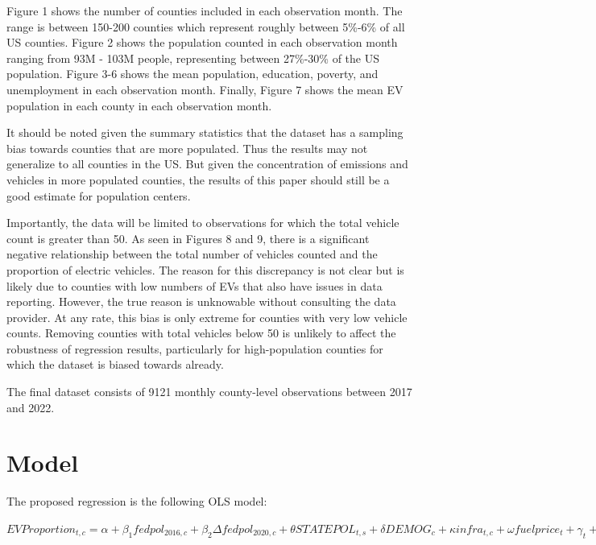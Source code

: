 \documentclass{article}
\begin{document}
Figure 1 shows the number of counties included in each observation month. The range is between 150-200 counties which represent roughly between 5\%-6\% of all US counties. Figure 2 shows the population counted in each observation month ranging from 93M - 103M people, representing between 27\%-30\% of the US population. Figure 3-6 shows the mean population, education, poverty, and unemployment in each observation month. Finally, Figure 7 shows the mean EV population in each county in each observation month.

It should be noted given the summary statistics that the dataset has a sampling bias towards counties that are more populated. Thus the results may not generalize to all counties in the US. But given the concentration of emissions and vehicles in more populated counties, the results of this paper should still be a good estimate for population centers.  

Importantly, the data will be limited to observations for which the total vehicle count is greater than 50. As seen in Figures 8 and 9, there is a significant negative relationship between the total number of vehicles counted and the proportion of electric vehicles. The reason for this discrepancy is not clear but is likely due to counties with low numbers of EVs that also have issues in data reporting. However, the true reason is unknowable without consulting the data provider. At any rate, this bias is only extreme for counties with very low vehicle counts. Removing counties with total vehicles below 50 is unlikely to affect the robustness of regression results, particularly for high-population counties for which the dataset is biased towards already. 

The final dataset consists of 9121 monthly county-level observations between 2017 and 2022. 

\section{Model}

The proposed regression is the following OLS model:

\vspace{0.5cm}

${EV Proportion_{t,c}} = \alpha + \beta_{1} fed pol_{2016,c} + \beta_{2} \Delta fed pol_{2020,c} +\theta STATE POL_{t,s} +\delta  DEMOG_{c} + \kappa  infra_{t,c} + \omega fuelprice_{t} + \gamma_{t} + \tau_{s} +\epsilon$

\vspace{0.5cm}
\end{document}
